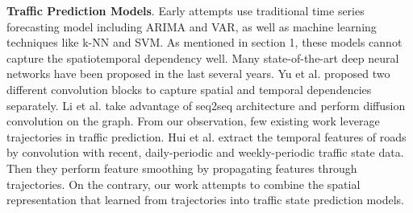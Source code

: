 \vspace{\baselineskip}

\textbf{Traffic Prediction Models}. Early attempts use traditional time series forecasting model including ARIMA\cite{ARIMA_pred} and VAR\cite{var_pred}, as well as machine learning techniques like k-NN\cite{knn_pred} and SVM\cite{svm_pred}. As mentioned in section 1, these models cannot capture the spatiotemporal dependency well. Many state-of-the-art deep neural networks have been proposed in the last several years. Yu et al.\cite{STGCN} proposed two different convolution blocks to capture spatial and temporal dependencies separately. Li et al.\cite{DCRNN} take advantage of seq2seq\cite{seq2seq} architecture and perform diffusion convolution on the graph. From our observation, few existing work leverage trajectories in traffic prediction. Hui et al.\cite{trajnet} extract the temporal features of roads by convolution with recent, daily-periodic and weekly-periodic traffic state data. Then they perform feature smoothing by propagating features through trajectories. On the contrary, our work attempts to combine the spatial representation that learned from trajectories into traffic state prediction models.
